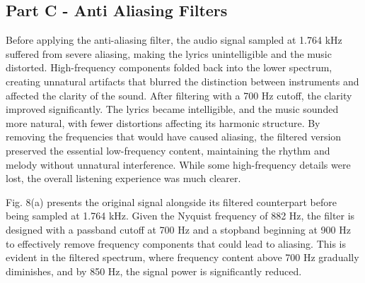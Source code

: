 \documentclass[12pt]{article}
\begin{document}
\subsection{Part C - Anti Aliasing Filters}
Before applying the anti-aliasing filter, the audio signal sampled at 1.764 kHz suffered from severe aliasing, making the lyrics unintelligible and the music distorted. High-frequency components folded back into the lower spectrum, creating unnatural artifacts that blurred the distinction between instruments and affected the clarity of the sound. After filtering with a 700 Hz cutoff, the clarity improved significantly. The lyrics became intelligible, and the music sounded more natural, with fewer distortions affecting its harmonic structure. By removing the frequencies that would have caused aliasing, the filtered version preserved the essential low-frequency content, maintaining the rhythm and melody without unnatural interference. While some high-frequency details were lost, the overall listening experience was much clearer.

Fig. 8(a) presents the original signal alongside its filtered counterpart before being sampled at 1.764 kHz. Given the Nyquist frequency of 882 Hz, the filter is designed with a passband cutoff at 700 Hz and a stopband beginning at 900 Hz to effectively remove frequency components that could lead to aliasing. This is evident in the filtered spectrum, where frequency content above 700 Hz gradually diminishes, and by 850 Hz, the signal power is significantly reduced.
\end{document}
